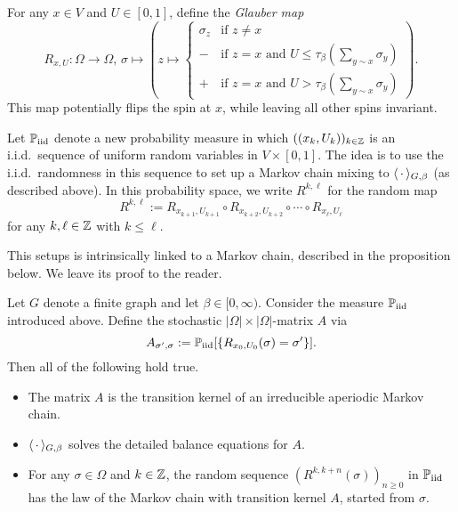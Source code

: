 \begin{definition}
    For any $x\in V$ and $U\in[0,1]$, define the \emph{Glauber map}
    \[
        R_{x,U}:\Omega\to\Omega,\,\sigma\mapsto
        \left(
            z\mapsto \begin{cases}
                \sigma_z&\text{if $z\neq x$}\\
                - &\text{if $z=x$ and $U\leq \tau_\beta(\sum_{y\sim x}\sigma_y)$}\\
                + &\text{if $z=x$ and $U>\tau_\beta(\sum_{y\sim x}\sigma_y)$}
            \end{cases} 
        \right).
    \]
    This map potentially flips the spin at $x$, while leaving all other spins invariant.
\end{definition}

\newcommand\Piid{\P_{\operatorname{iid}}}

Let $\Piid$ denote a new probability measure in which
 $((x_k,U_k))_{k\in\mathbb Z}$ is an i.i.d.\ sequence of
uniform random variables in $V\times[0,1]$.
The idea is to use the i.i.d.\ randomness in this sequence to set up a Markov chain
mixing to $\langle\,\cdot\,\rangle_{G,\beta}$ (as described above).
In this probability space, we write $R^{k,\ell}$ for the random map
\[
    R^{k,\ell}:=R_{x_{k+1},U_{k+1}}\circ R_{x_{k+2},U_{k+2}} \circ \cdots \circ R_{x_{\ell},U_{\ell}}
\]
for any $k,\ell\in\mathbb Z$ with $k\leq\ell$.

This setups is intrinsically linked to a Markov chain, described in the proposition below.
We leave its proof to the reader.

\begin{proposition}
    Let $G$ denote a finite graph and let $\beta\in[0,\infty)$.
    Consider the measure $\Piid$ introduced above.
    Define the stochastic $|\Omega|\times|\Omega|$-matrix $A$ via
    \[
        A_{\sigma',\sigma}:=\Piid[\{R_{x_0,U_0}(\sigma)=\sigma'\}].
    \]
    Then all of the following hold true.
    \begin{itemize}
        \item The matrix $A$ is the transition kernel of an irreducible aperiodic Markov chain.
        \item $\langle\,\cdot\,\rangle_{G,\beta}$ solves the detailed balance equations for $A$.
        \item For any $\sigma\in\Omega$ and $k\in\mathbb Z$, the random sequence
        \(
            (R^{k,k+n}(\sigma))_{n\geq 0}
        \)
        in $\Piid$
        has the law of the Markov chain with transition kernel $A$, started from $\sigma$.
    \end{itemize}
\end{proposition}

